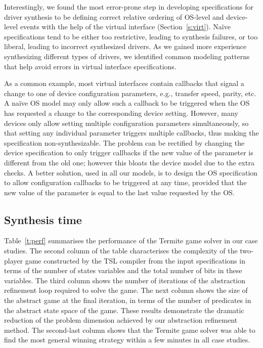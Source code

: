 \documentclass{book}
\newcommand{\termite}{Termite\xspace}
\newcommand{\tsl}{TSL\xspace}
\theoremstyle{definition}
\begin{document}
Interestingly, we found the most error-prone step in developing specifications for driver synthesis to be defining correct relative ordering of OS-level and device-level events with the help of the virtual interface (Section~\ref{s:virt}).  Na\"ive specifications tend to be either too restrictive, leading to synthesis failures, or too liberal, leading to incorrect synthesized drivers. As we gained more experience synthesizing different types of drivers, we identified common modeling patterns that help avoid errors in virtual interface specifications.  

As a common example, most virtual interfaces contain callbacks that signal a change to one of device configuration parameters, e.g., transfer speed, parity, etc.  A na\"ive OS model may only allow such a callback to be triggered when the OS has requested a change to the corresponding device setting.  However, many devices only allow setting multiple configuration parameters simultaneously, so that setting any individual parameter triggers multiple callbacks, thus making the specification non-synthesizable.  The problem can be rectified by changing the device specification to only trigger callbacks if the new value of the parameter is different from the old one; however this bloats the device model due to the extra checks.  A better solution, used in all our models, is to design the OS specification to allow configuration callbacks to be triggered at any time, provided that the new value of the parameter is equal to the last value requested by the OS. 

\subsection{Synthesis time} 
Table~\ref{t:perf} summarises the performance of the \termite game solver in our case studies.  The second column of the table characterises the complexity of the two-player game constructed by the \tsl compiler from the input specifications in terms of the number of states variables and the total number of bits in these variables.  The third column shows the number of iterations of the abstraction refinement loop required to solve the game.  The next column shows the size of the abstract game at the final iteration, in terms of the number of predicates in the abstract state space of the game.  These results demonstrate the dramatic reduction of the problem dimension achieved by our abstraction refinement method.  The second-last column shows that the \termite game solver was able to find the most general winning strategy within a few minutes in all case studies.
\end{document}
